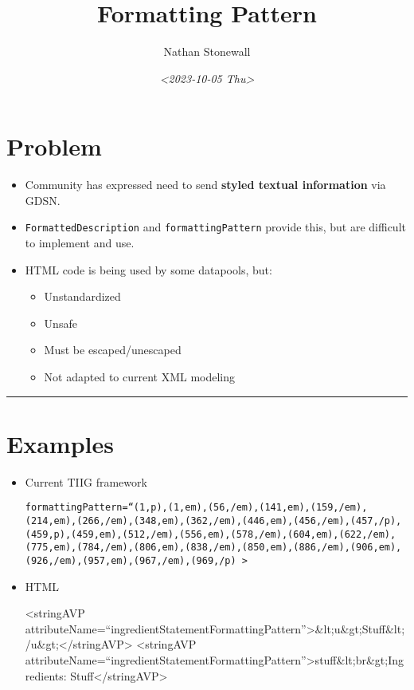 \documentclass[11pt]{article}
\author{Nathan Stonewall}
\date{\textit{<2023-10-05 Thu>}}
\title{Formatting Pattern}
\begin{document}
\maketitle
\tableofcontents

\section*{Problem}
\label{sec:orgfd4531d}
\begin{itemize}
\item Community has expressed need to send \textbf{\textbf{styled textual information}} via GDSN.

\item \texttt{FormattedDescription} and \texttt{formattingPattern} provide this, but are difficult to implement and use.

\item HTML code is being used by some datapools, but:
\begin{itemize}
\item Unstandardized
\item Unsafe
\item Must be escaped/unescaped
\item Not adapted to current XML modeling
\end{itemize}
\end{itemize}

\noindent\rule{\textwidth}{0.5pt}
\section*{Examples}
\label{sec:orga202625}
\begin{itemize}
\item Current TIIG framework
\label{sec:orgd572f51}
\begin{verbatim}
formattingPattern=“(1,p),(1,em),(56,/em),(141,em),(159,/em),(214,em),(266,/em),(348,em),(362,/em),(446,em),(456,/em),(457,/p),(459,p),(459,em),(512,/em),(556,em),(578,/em),(604,em),(622,/em),(775,em),(784,/em),(806,em),(838,/em),(850,em),(886,/em),(906,em),(926,/em),(957,em),(967,/em),(969,/p) >
\end{verbatim}
\item HTML
\label{sec:orgdae6b0d}
\begin{XML}
<stringAVP attributeName=``ingredientStatementFormattingPattern''>\&lt;u\&gt;Stuff\&lt;/u\&gt;</stringAVP>
<stringAVP attributeName=``ingredientStatementFormattingPattern''>stuff\&lt;br\&gt;Ingredients: Stuff</stringAVP>
\end{XML}
\end{itemize}
\end{document}
